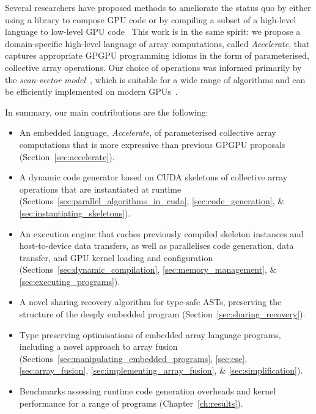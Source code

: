 Several researchers have proposed methods to ameliorate the status quo by either
using a library to compose GPU code or by compiling a subset of a high-level
language to low-level GPU
code~\cite{McCool:2004,Bond:2010bd,ThrustAParallelT:ub,Catanzaro:2011cn,Mainland:2010vj,CLyther:EvXSiruK}
This work is in the same spirit: we propose a domain-specific high-level
language of array computations, called \emph{Accelerate}, that captures
appropriate GPGPU programming idioms in the form of parameterised, collective
array operations. Our choice of operations was informed primarily by the
\emph{scan-vector model}~\cite{Chatterjee:1990vj}, which is suitable for a wide
range of algorithms and can be efficiently implemented on modern
GPUs~\cite{Sengupta:2007tc}.

In summary, our main contributions are the following:
%
\begin{itemize}
    \item An embedded language, \emph{Accelerate}, of parameterised collective
        array computations that is more expressive than previous GPGPU proposals
        (Section~\ref{sec:accelerate}).

    \item A dynamic code generator based on CUDA skeletons of collective array
        operations that are instantiated at runtime
        (Sections~\ref{sec:parallel_algorithms_in_cuda},
        \ref{sec:code_generation}, \&
        \ref{sec:instantiating_skeletons}).

    \item An execution engine that caches previously compiled skeleton instances
        and host-to-device data transfers, as well as parallelises code
        generation, data transfer, and GPU kernel loading and configuration
        (Sections~\ref{sec:dynamic_compilation},
        \ref{sec:memory_management}, \&
        \ref{sec:executing_programs}).

    \item A novel sharing recovery algorithm for type-safe ASTs, preserving the
        structure of the deeply embedded program
        (Section~\ref{sec:sharing_recovery}).

    \item Type preserving optimisations of embedded array language programs,
        including a novel approach to array fusion %
        (Sections~\ref{sec:manipulating_embedded_programs},
        \ref{sec:cse},
        \ref{sec:array_fusion},
        \ref{sec:implementing_array_fusion}, \&
        \ref{sec:simplification}).

    \item Benchmarks assessing runtime code generation overheads and kernel
        performance for a range of programs (Chapter~\ref{ch:results}).
\end{itemize}

